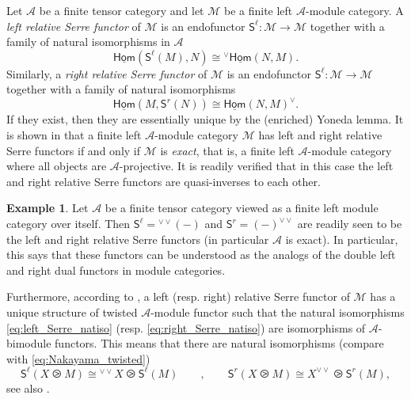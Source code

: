 \documentclass[11pt]{article}
\theoremstyle{definition}
\newtheorem{example}[theorem]{Example}
\begin{document}
Let $\mathcal{A}$ be a finite tensor category and let $\mathcal{M}$ be a finite left $\mathcal{A}$-module category. A \emph{left relative Serre functor} of $\mathcal{M}$ is an endofunctor $\mathsf{S}^\ell : \mathcal{M} \longrightarrow \mathcal{M}$ together with a family of natural isomorphisms in $\mathcal{A}$ 
\begin{equation}\label{eq:left_Serre_natiso}
\underline{\mathsf{Hom}} (\mathsf{S}^\ell(M),N) \cong {}^\vee \underline{\mathsf{Hom}}(N,M). 
\end{equation}
Similarly, 
a \emph{right relative Serre functor} of $\mathcal{M}$ is an endofunctor $\mathsf{S}^\ell : \mathcal{M} \longrightarrow \mathcal{M}$ together with a family of natural isomorphisms
\begin{equation}\label{eq:right_Serre_natiso}
 \underline{\mathsf{Hom}} (M,\mathsf{S}^r(N)) \cong \underline{\mathsf{Hom}}(N,M)^\vee . 
\end{equation}
If they exist, then they are essentially unique by the (enriched) Yoneda lemma. It is shown in \cite[Proposition 4.24]{fss} that a finite left $\mathcal{A}$-module category $\mathcal{M}$ has left and right relative Serre functors if and only if $\mathcal{M}$ is \emph{exact}, that is, a finite left $\mathcal{A}$-module category where all objects  are $\mathcal{A}$-projective. It is readily verified that in this case the left and right relative Serre functors are quasi-inverses to each other.

\begin{example}\label{ex:Serre_funct_in_ftc}
Let $\mathcal{A}$ be a finite tensor category viewed as a finite left module category over itself. Then  $\mathsf{S}^\ell = {}^{\vee \vee}(-)$ and  $\mathsf{S}^r = (-)^{\vee \vee}$ are readily seen to be  the left and right relative Serre functors (in particular $\mathcal{A}$ is exact). In particular, this says that these functors can be understood as the analogs of the double left and right dual functors in module categories.
\end{example}

Furthermore, according to \cite[\S 3.3]{relserre}, a left (resp. right) relative Serre functor of $\mathcal{M}$ has a unique structure of twisted $\mathcal{A}$-module functor such that the natural isomorphisms \eqref{eq:left_Serre_natiso} (resp.  \eqref{eq:right_Serre_natiso}) are isomorphisms of $\mathcal{A}$-bimodule functors. This means that there are natural isomorphisms (compare with \eqref{eq:Nakayama_twisted})
\begin{equation}\label{eq:Serre_twisted}
\mathsf{S}^\ell(X \ogreaterthan M) \cong {}^{\vee \vee} X 	\ogreaterthan  \mathsf{S}^\ell( M) \qquad , \qquad \mathsf{S}^r(X \ogreaterthan M) \cong  X^{\vee \vee} 	\ogreaterthan  \mathsf{S}^r( M),
\end{equation}
see also \cite[Lemma 4.23]{fss}.
\end{document}

